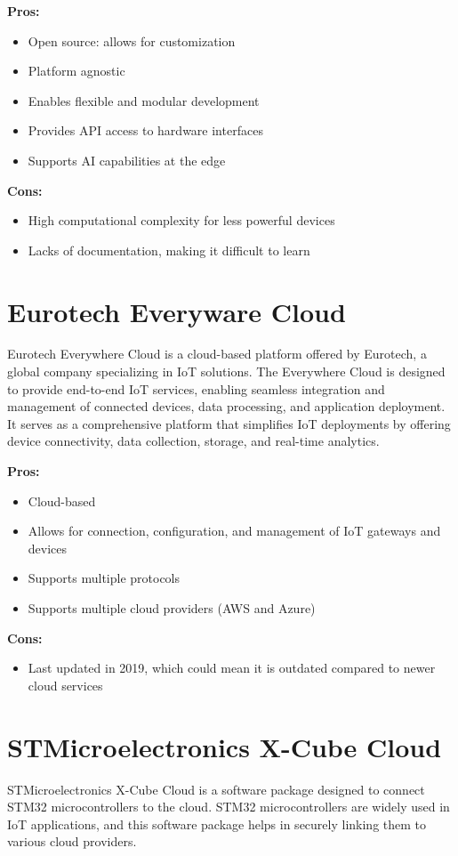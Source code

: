\textbf{Pros:}
\begin{itemize}
    \item Open source: allows for customization
    \item Platform agnostic
    \item Enables flexible and modular development
    \item Provides API access to hardware interfaces
    \item Supports AI capabilities at the edge
\end{itemize}

\textbf{Cons:}
\begin{itemize}
    \item High computational complexity for less powerful devices
    \item Lacks of documentation, making it difficult to learn
\end{itemize}

\section{Eurotech Everyware Cloud}
\label{everyware-cloud}
Eurotech\cite{site:eurotech} Everywhere Cloud is a cloud-based platform offered by Eurotech, a global company specializing in IoT solutions. The Everywhere Cloud is designed to provide end-to-end IoT services, enabling seamless integration and management of connected devices, data processing, and application deployment. It serves as a comprehensive platform that simplifies IoT deployments by offering device connectivity, data collection, storage, and real-time analytics.

\textbf{Pros:}
\begin{itemize}
    \item Cloud-based
    \item Allows for connection, configuration, and management of IoT gateways and devices
    \item Supports multiple protocols
    \item Supports multiple cloud providers (AWS and Azure)
\end{itemize}

\textbf{Cons:}
\begin{itemize}
    \item Last updated in 2019, which could mean it is outdated compared to newer cloud services
\end{itemize}

\section{STMicroelectronics X-Cube Cloud}
\label{stm}
STMicroelectronics\cite{site:st-micro} X-Cube Cloud is a software package designed to connect STM32 microcontrollers to the cloud. STM32 microcontrollers are widely used in IoT applications, and this software package helps in securely linking them to various cloud providers.

